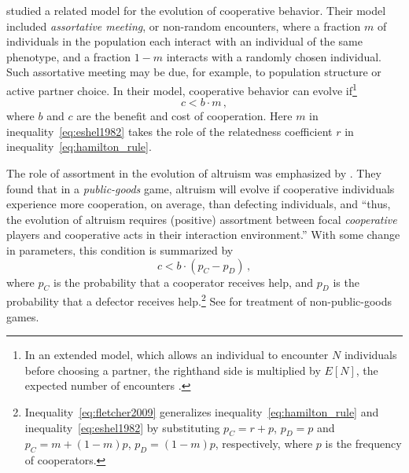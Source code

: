 \documentclass[12pt]{extarticle}
\begin{document}
\citet{Eshel1982} studied a related model for the evolution of cooperative behavior.
Their model included \emph{assortative meeting}, or non-random encounters, where a fraction $m$ of individuals in the population each interact with an individual of the same phenotype, and a fraction $1-m$ interacts  with a randomly chosen individual.  
Such assortative meeting may be due, for example, to population structure or active partner choice.
In their model, cooperative behavior can evolve if\footnote{In an extended model, which allows an individual to encounter $N$ individuals before choosing a partner, the righthand side is multiplied by $E[N]$, the expected number of encounters \citep[eq.~4.6]{Eshel1982}.
} 
\citep[eq.~3.2]{Eshel1982}
\begin{equation} \label{eq:eshel1982}
c < b \cdot m \,,
\end{equation}
where $b$ and $c$ are the benefit and cost of cooperation. 
Here $m$ in inequality~\ref{eq:eshel1982} takes the role of the relatedness coefficient $r$ in inequality~\ref{eq:hamilton_rule}.

The role of assortment in the evolution of altruism was emphasized by \citet{Fletcher2009assortment}.
They found that in a \emph{public-goods} game, altruism will evolve if cooperative individuals experience more cooperation, on average, than defecting individuals, and ``thus, the evolution of altruism requires (positive) assortment between focal \emph{cooperative} players and cooperative acts in their interaction environment.''
With some change in parameters, this condition is summarized by \citep[eq.~2.3]{Fletcher2009assortment}
\begin{equation} \label{eq:fletcher2009}
c < b \cdot (p_C - p_D ) \,,
\end{equation}
where $p_C$ is the probability that a cooperator receives help, and $p_D$ is the probability that a defector receives help.\footnote{Inequality~\ref{eq:fletcher2009} generalizes inequality~\ref{eq:hamilton_rule} and inequality~\ref{eq:eshel1982} by substituting $p_C=r + p$, $p_D=p$ and $p_C=m + (1-m)p$, $p_D=(1-m)p$, respectively, where $p$ is the frequency of cooperators.}
See \citet{Bijma2010assortment} for treatment of non-public-goods games.
\end{document}
